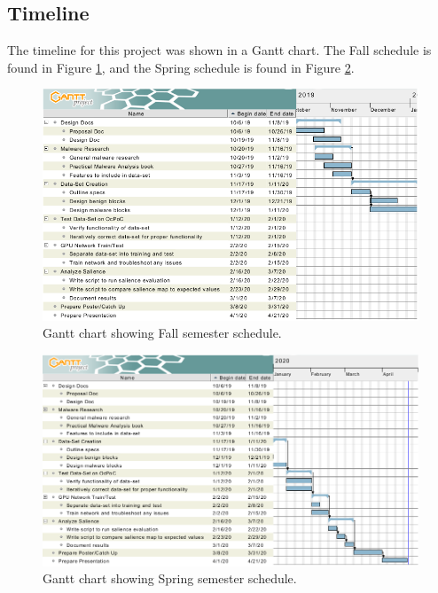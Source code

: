 \documentclass[12pt, letterpaper, titlepage]{article}
\newcommand{\figRef}[1]{Figure \ref{#1}}
\begin{document}
\subsection{Timeline}
The timeline for this project was shown in a Gantt chart.
The Fall schedule is found in \figRef{fig:GanttFall}, and the Spring schedule is found in \figRef{fig:GanttSpring}.

\begin{figure}[H]
  \centering
  \includegraphics[width=\textwidth, keepaspectratio]{Images/Gantt_Chart_v2_Fall.png}
  \caption{Gantt chart showing Fall semester schedule.}
  \label{fig:GanttFall}
\end{figure}

\begin{figure}[H]
  \centering
  \includegraphics[width=\textwidth, keepaspectratio]{Images/Gantt_Chart_v2_Spring.png}
  \caption{Gantt chart showing Spring semester schedule.}
  \label{fig:GanttSpring}
\end{figure}

\pagebreak
\end{document}
